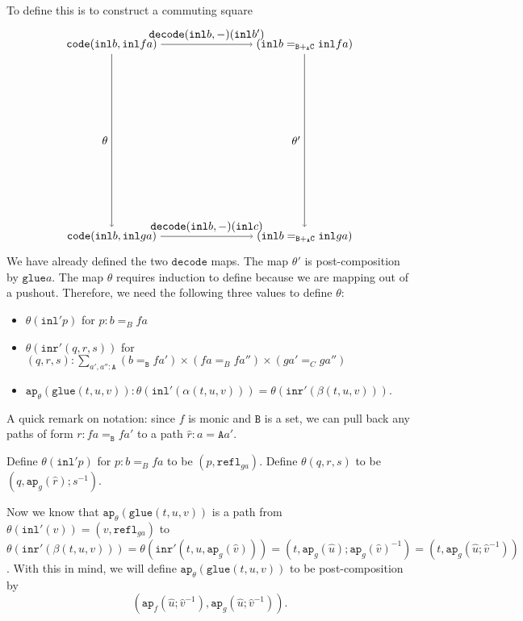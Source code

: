 \message{ !name(notes.tex)}\documentclass[12pt]{amsart}
\newcommand{\type}[1]{\mathtt{#1}}
\newcommand{\tin}{\colon}
\newcommand{\A}{\type{A}}
\newcommand{\B}{\type{B}}
\newcommand{\C}{\type{C}}
\newcommand{\BAC}{\B +_{\A} \C}
\newcommand{\ap}{\type{ap}}
\newcommand{\inl}{\type{inl}}
\newcommand{\inr}{\type{inr}}
\newcommand{\glue}{\type{glue}}
\newcommand{\refl}{\type{refl}}
\newcommand{\code}{\type{code}}
\newcommand{\decode}{\type{decode}}
\theoremstyle{remark}
\theoremstyle{definition}
\begin{document}
To define this is to construct a commuting square
\[
\begin{tikzpicture}
  \node (code-bb) at (-3,3) {\( \code ( \inl b , \inl fa ) \)};
  \node (code-bc) at (-3,-3) {\( \code ( \inl b , \inl ga ) \)};
  \node (id-bb) at (3,3) {\( ( \inl b =_{\BAC} \inl fa ) \)};
  \node (id-bc) at (3,-3) {\( ( \inl b =_{\BAC} \inl ga ) \)};
  \draw [->] (code-bb) to node [left] {\( \theta \)} (code-bc);
  \draw [->] (code-bb) to node [above] {\( \decode (\inl b,-)(\inl b') \)} (id-bb);
  \draw [->] (id-bb) to node [left] {\( \theta' \)} (id-bc);
  \draw [->] (code-bc) to node [above] {\( \decode (\inl b,-)(\inl c) \)} (id-bc);
\end{tikzpicture}
\]
We have already defined the two \( \decode \) maps. The map \( \theta'
\) is post-composition by \( \glue a \). The map \( \theta \) requires
induction to define because we are mapping out of a pushout.
Therefore, we need the following three values to define \( \theta \):
\begin{itemize}
\item \( \theta (\inl' p) \) for \( p \tin b=_Bfa \)
\item \( \theta ( \inr' (q,r,s) ) \) for \( (q,r,s) \tin
  \sum\limits_{a',a'' \tin \A} (b=_\B fa') \times (fa =_B fa'') \times
  (ga' =_C ga'') \) 
\item \( \ap_{ \theta } ( \glue (t,u,v) ) \tin \theta ( \inl' (\alpha
  (t,u,v) ) ) = \theta ( \inr' ( \beta (t,u,v) ) ) \).
\end{itemize}

A quick remark on notation: since \( f \) is monic and \( \B \) is a
set, we can pull back any paths of form \( r \tin fa =_\B fa'\) to a
path \( \hat{r} \tin a =\A a' \).

Define \( \theta (\inl' p) \) for \( p \tin b=_Bfa \) to
be \( ( p , \refl_{ga} ) \). Define \( \theta ( q,r,s ) \) to be \( (
q , \ap_g ( \hat{r} ) ; s^{-1} ) \).

Now we know that \( \ap_{ \theta } ( \glue ( t,u,v ) ) \) is a path from
\(\theta ( \inl' ( v ) ) = ( v , \refl_{ga} ) \) to \( \theta ( \inr'
( \beta ( t,u,v ) ) ) = \theta ( \inr' ( t,u,\ap_{g}(\hat{v}) ) ) = (
t,\ap_g ( \hat{u} ); \ap_g ( \hat{v} )^{-1} ) = ( t, \ap_g ( \hat{u} ;
\hat{v}^{-1}) ) \). With this in mind, we will define \( \ap_{\theta}
( \glue ( t,u,v ) ) \) to be post-composition by
\[
  ( \ap_f ( \hat{u};\hat{v}^{-1} ) , \ap_g ( \hat{u};\hat{v}^{-1} ) ).
\]
\end{document}
